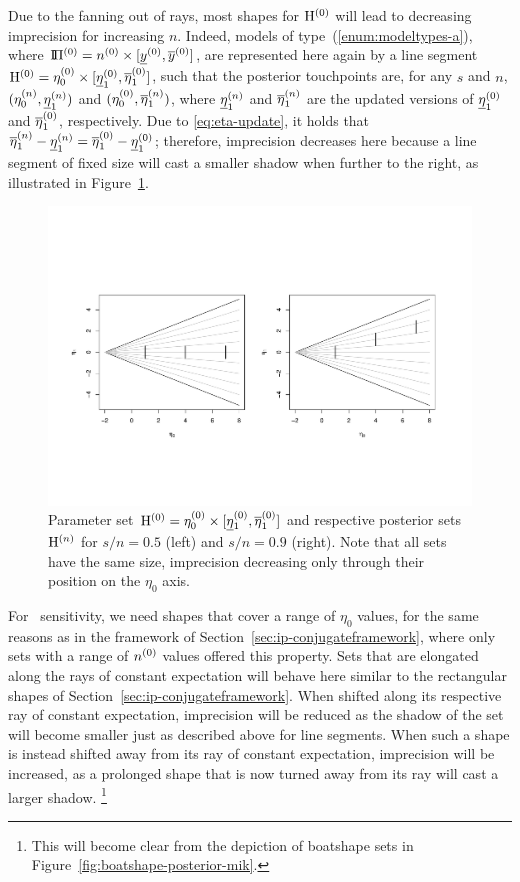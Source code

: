 Due to the fanning out of rays, most shapes for $\EZ$ will lead to decreasing imprecision for increasing $n$.
Indeed, models of type~(\ref{enum:modeltypes-a}),
where $\text{I}\!\Pi^{(0)} = n^{(0)} \times [\underline{y}^{(0)}, \overline{y}^{(0)}]$,
are represented here again by a line segment $\mathrm{H}^{(0)} = \eta_0^{(0)} \times [\underline{\eta}_1^{(0)},\overline{\eta}_1^{(0)}]$,
such that the posterior touchpoints are, for any $s$ and $n$, $(\eta_0^{(n)},\underline{\eta}_1^{(n)})$ and $(\eta_0^{(0)},\overline{\eta}_1^{(n)})$,
where $\underline{\eta}_1^{(n)}$ and $\overline{\eta}_1^{(n)}$ are the updated versions of $\underline{\eta}_1^{(0)}$ and $\overline{\eta}_1^{(0)}$, respectively.
Due to \eqref{eq:eta-update}, it holds that $\overline{\eta}_1^{(n)}-\underline{\eta}_1^{(n)} = \overline{\eta}_1^{(0)}-\underline{\eta}_1^{(0)}$;
therefore, imprecision decreases here because a line segment of fixed size
will cast a smaller shadow when further to the right,
as illustrated in Figure~\ref{fig:boatshape-vertical}.

\begin{figure}  %
\centering
\includegraphics[trim = 15mm 45mm 25mm 60mm, clip, width=\textwidth]{R/boatshape-vertical}%
\caption[Line segment parameter set $\EZ$ %
and respective posterior sets for $s/n=0.5$ and $s/n=0.9$.]%
{Parameter set $\mathrm{H}^{(0)} = \eta_0^{(0)} \times [\text{\underline{$\eta$}${}_1^{(0)}$},\overline{\eta}_1^{(0)}]$ and respective posterior sets $\mathrm{H}^{(n)}$
for $s/n=0.5$ (left) and $s/n=0.9$ (right). Note that all sets have the same size,
imprecision decreasing only through their position on the $\eta_0$ axis.}
\label{fig:boatshape-vertical}
\end{figure}

For \pdc\ sensitivity, we need shapes that cover a range of $\eta_0$ values,
for the same reasons as in the framework of Section~\ref{sec:ip-conjugateframework},
where only sets with a range of $n^{(0)}$ values offered this property.
Sets that are elongated along the rays of constant expectation
will behave here similar to the rectangular shapes of Section~\ref{sec:ip-conjugateframework}.
When shifted along its respective ray of constant expectation,
imprecision will be reduced as the shadow of the set will become smaller just as described above for line segments.
When such a shape is instead shifted away from its ray of constant expectation,
imprecision will be increased, as a prolonged shape that is now turned away from its ray 
will cast a larger shadow.%
\footnote{This will become clear from the depiction of boatshape sets in Figure~\ref{fig:boatshape-posterior-mik}.} 

